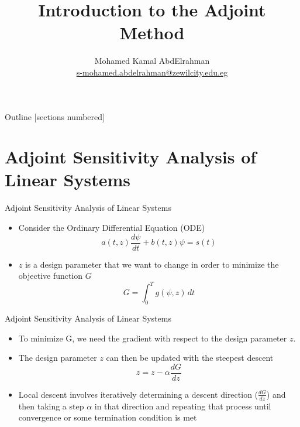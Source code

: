 \documentclass[10pt]{beamer}
\title{Introduction to the Adjoint Method}
\author{
	Mohamed Kamal AbdElrahman \\
 \href{my_email}{s-mohamed.abdelrahman@zewilcity.edu.eg}}
\institute{University of Science and Technology \\[10pt] Zewail City}
\date{}
\begin{document}
\begin{frame}
	\titlepage
\end{frame}
\begin{frame}{Outline}
	[sections numbered]
	\tableofcontents%
\end{frame}
\section{Adjoint Sensitivity Analysis of Linear Systems}
\begin{frame}{Adjoint Sensitivity Analysis of Linear Systems}
	\begin{itemize}
		\item  Consider the Ordinary Differential Equation (ODE)
		\begin{equation}
 a(t,z)\frac{d \psi}{dt} +b(t,z) \psi = s(t) 
		\end{equation}
\item $z$ is a design parameter that we want to change in order to minimize the objective function $G$
\begin{equation}
G = \int^{T}_0  g(\psi,z) \, dt
\end{equation}
	\end{itemize}
\end{frame}

\begin{frame}{Adjoint Sensitivity Analysis of Linear Systems}
	\begin{itemize}
	\item  To minimize G, we  need the gradient with respect to the design parameter $z$.
	
	\item The  design parameter $z$ can then be updated with the steepest descent 
	\begin{equation}
	z = z - \alpha \frac{dG}{dz}
	\end{equation}
	
	\item Local descent involves iteratively determining a descent direction ($ \frac{dG}{dz}$) and	then taking a step $\alpha$ in that direction and repeating that process until convergence or some termination condition is met
	\end{itemize}
\end{frame}
\end{document}
